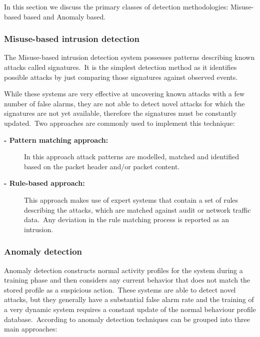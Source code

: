 			In this section we discuss the primary classes of detection methodologies: Misuse-based based and Anomaly based.

			\subsubsection{Misuse-based intrusion detection}

				The Misuse-based intrusion detection system possesses patterns describing known attacks called signatures.\ It is the simplest detection method as it identifies possible attacks by just comparing those signatures against observed events. 


				While these systems are very effective at uncovering known attacks with a few number of false alarms, they are not able to detect novel attacks for which the signatures are not yet available, therefore the signatures must be constantly updated.\ Two approaches are commonly used to implement this technique: 

				\begin{description}

					\item[\textbf{- Pattern matching approach:}] In this approach attack patterns are modelled, matched and identified based on the packet header and/or packet content.
					\item[\textbf{- Rule-based approach:}] This approach makes use of expert systems that contain a set of rules describing the attacks, which are matched against audit or network traffic data.\ Any deviation in the rule matching process is reported as an intrusion.

				\end{description}
	
			\subsubsection{Anomaly detection} 

				Anomaly detection constructs normal activity profiles for the system during a training phase and then considers any current behavior that does not match the stored profile as a suspicious action.\ These systems are able to detect novel attacks, but they generally have a substantial false alarm rate and the training of a very dynamic system requires a constant update of the normal behaviour profile database.\ According to \cite{AnomalyBasedNID} anomaly detection techniques can be grouped into three main approaches:

